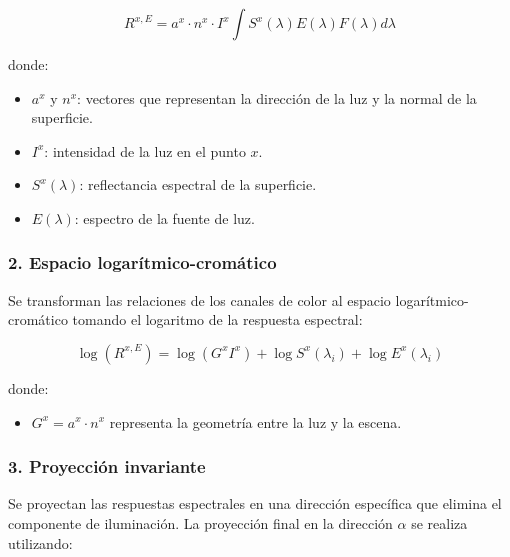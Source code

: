 $$R^{x,E} =a^x \cdot n^x \cdot I^x \int S^x (\lambda )E(\lambda )F(\lambda )d\lambda$$

donde:

\begin{itemize}
\setlength{\itemsep}{-1ex}
   \item{\begin{flushleft} $a^x$ y $n^x$: vectores que representan la dirección de la luz y la normal de la superficie. \end{flushleft}}
   \item{\begin{flushleft} $I^x$: intensidad de la luz en el punto $x$. \end{flushleft}}
   \item{\begin{flushleft} $S^x (\lambda )$: reflectancia espectral de la superficie. \end{flushleft}}
   \item{\begin{flushleft} $E(\lambda )$: espectro de la fuente de luz. \end{flushleft}}
\end{itemize}

\subsubsection{2. Espacio logarítmico-cromático}

Se transforman las relaciones de los canales de color al espacio logarítmico-cromático tomando el logaritmo de la respuesta espectral:

$$\log (R^{x,E} )=\log (G^x I^x )+\log S^x (\lambda_i )+\log E^x (\lambda_i )$$

donde:

\begin{itemize}
\setlength{\itemsep}{-1ex}
   \item{\begin{flushleft} $G^x =a^x \cdot n^x$ representa la geometría entre la luz y la escena. \end{flushleft}}
\end{itemize}

\subsubsection{3. Proyección invariante}

Se proyectan las respuestas espectrales en una dirección específica que elimina el componente de iluminación. La proyección final en la dirección $\alpha$ se realiza utilizando:

